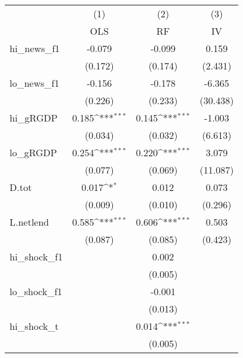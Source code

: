 {
\def\sym#1{\ifmmode^{#1}\else\(^{#1}\)\fi}
\begin{tabular}{l*{3}{c}}
\toprule
            &\multicolumn{1}{c}{(1)}&\multicolumn{1}{c}{(2)}&\multicolumn{1}{c}{(3)}\\
            &\multicolumn{1}{c}{OLS}&\multicolumn{1}{c}{RF}&\multicolumn{1}{c}{IV}\\
\midrule
hi\_news\_f1  &      -0.079         &      -0.099         &       0.159         \\
            &     (0.172)         &     (0.174)         &     (2.431)         \\
\addlinespace
lo\_news\_f1  &      -0.156         &      -0.178         &      -6.365         \\
            &     (0.226)         &     (0.233)         &    (30.438)         \\
\addlinespace
hi\_gRGDP    &       0.185\sym{***}&       0.145\sym{***}&      -1.003         \\
            &     (0.034)         &     (0.032)         &     (6.613)         \\
\addlinespace
lo\_gRGDP    &       0.254\sym{***}&       0.220\sym{***}&       3.079         \\
            &     (0.077)         &     (0.069)         &    (11.087)         \\
\addlinespace
D.tot       &       0.017\sym{*}  &       0.012         &       0.073         \\
            &     (0.009)         &     (0.010)         &     (0.296)         \\
\addlinespace
L.netlend   &       0.585\sym{***}&       0.606\sym{***}&       0.503         \\
            &     (0.087)         &     (0.085)         &     (0.423)         \\
\addlinespace
hi\_shock\_f1 &                     &       0.002         &                     \\
            &                     &     (0.005)         &                     \\
\addlinespace
lo\_shock\_f1 &                     &      -0.001         &                     \\
            &                     &     (0.013)         &                     \\
\addlinespace
hi\_shock\_t  &                     &       0.014\sym{***}&                     \\
            &                     &     (0.005)         &                     \\

\end{tabular}}
